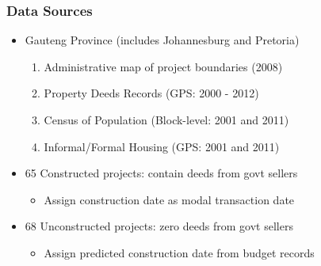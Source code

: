 \documentclass[aspectratio=32]{beamer}
\begin{document}
\begin{frame}
\frametitle{Data Sources}

\begin{itemize}
  \item Gauteng Province (includes Johannesburg and Pretoria)
  \vspace{2mm}
  \begin{enumerate}
    \item Administrative map of project boundaries (2008)
    \vspace{2mm}
    \item Property Deeds Records (GPS: 2000 - 2012)
    \vspace{2mm}
    \item Census of Population (Block-level: 2001 and 2011)
    \vspace{2mm}
    \item Informal/Formal Housing (GPS: 2001 and 2011)
     \end{enumerate}

\vspace{2mm}
  \item 65 Constructed projects: contain deeds from govt sellers
    \begin{itemize}
      \item Assign construction date as modal transaction date 
    \end{itemize}
\vspace{1mm}
  \item 68 Unconstructed projects: zero deeds from govt sellers
    \begin{itemize}
      \item Assign predicted construction date from budget records
    \end{itemize}
\end{itemize}

\end{frame}



\end{document}
